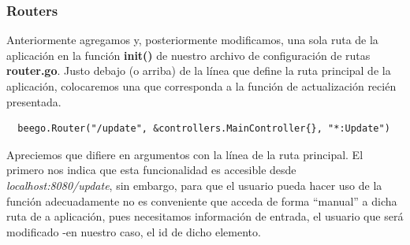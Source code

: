 \documentclass[12pt]{article}
\begin{document}
\subsubsection{Routers}
Anteriormente agregamos y, posteriormente modificamos, una sola ruta de la aplicación en la función
\textbf{init()} de nuestro archivo de configuración de rutas \textbf{router.go}.
Justo debajo (o arriba) de la línea que define la ruta principal de la aplicación, colocaremos
una que corresponda a la función de actualización recién presentada.
\begin{verbatim}
  beego.Router("/update", &controllers.MainController{}, "*:Update")  
\end{verbatim}
Apreciemos que difiere en argumentos con la línea de la ruta principal. El primero nos indica que esta
funcionalidad es accesible desde \textit{localhost:8080/update}, sin embargo, para que el usuario
pueda hacer uso de la función adecuadamente no es conveniente que acceda de forma ``manual'' a dicha ruta de a aplicación,
pues necesitamos información de entrada, el usuario que será modificado -en nuestro caso, el id de dicho
elemento. 
\end{document}
